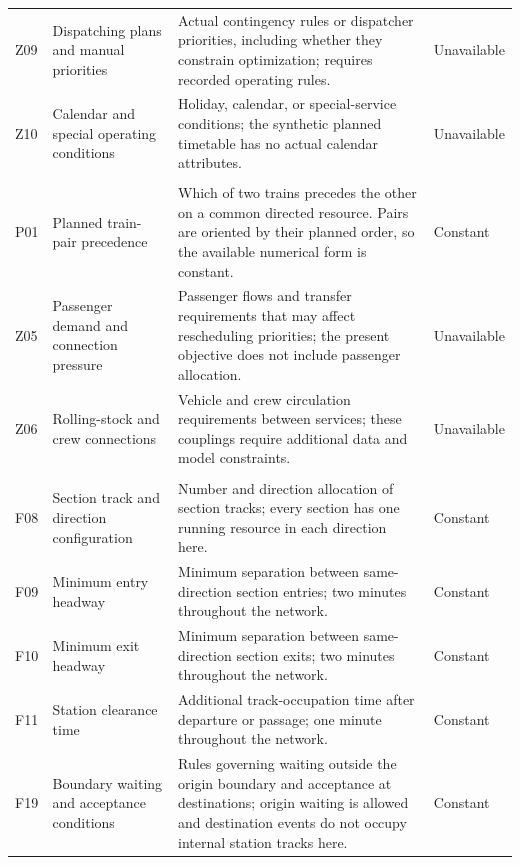\begin{longtable}{@{}>{\raggedright\arraybackslash}p{0.7cm}>{\raggedright\arraybackslash}p{3.0cm}>{\raggedright\arraybackslash}p{8.6cm}>{\raggedright\arraybackslash}p{1.9cm}@{}}
Z09 & Dispatching plans and manual priorities & Actual contingency rules or dispatcher priorities, including whether they constrain optimization; requires recorded operating rules. & Unavailable \\

Z10 & Calendar and special operating conditions & Holiday, calendar, or special-service conditions; the synthetic planned timetable has no actual calendar attributes. & Unavailable \\

\multicolumn{4}{@{}l}{\textbf{Train interactions}}\\*[2pt]

P01 & Planned train-pair precedence & Which of two trains precedes the other on a common directed resource. Pairs are oriented by their planned order, so the available numerical form is constant. & Constant \\

Z05 & Passenger demand and connection pressure & Passenger flows and transfer requirements that may affect rescheduling priorities; the present objective does not include passenger allocation. & Unavailable \\

Z06 & Rolling-stock and crew connections & Vehicle and crew circulation requirements between services; these couplings require additional data and model constraints. & Unavailable \\

\multicolumn{4}{@{}l}{\textbf{Infrastructure utilization}}\\*[2pt]

F08 & Section track and direction configuration & Number and direction allocation of section tracks; every section has one running resource in each direction here. & Constant \\

F09 & Minimum entry headway & Minimum separation between same-direction section entries; two minutes throughout the network. & Constant \\

F10 & Minimum exit headway & Minimum separation between same-direction section exits; two minutes throughout the network. & Constant \\

F11 & Station clearance time & Additional track-occupation time after departure or passage; one minute throughout the network. & Constant \\

F19 & Boundary waiting and acceptance conditions & Rules governing waiting outside the origin boundary and acceptance at destinations; origin waiting is allowed and destination events do not occupy internal station tracks here. & Constant \\


\end{longtable}
